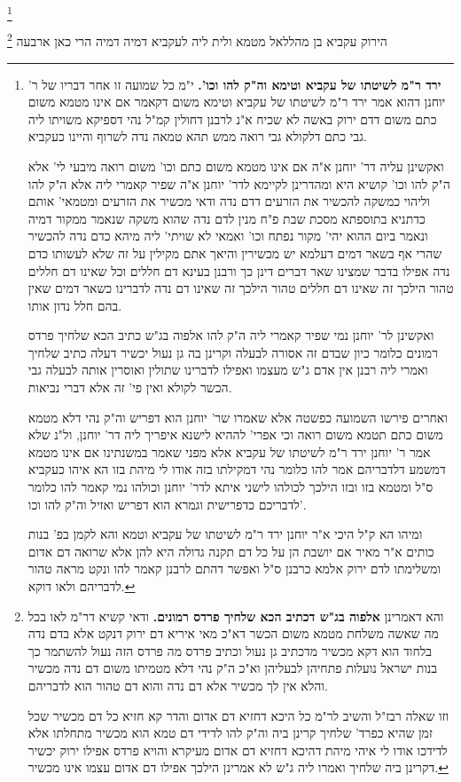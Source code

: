 \documentclass[12pt, openany]{book}
\newcommand{\footnotecomment}[1]{\footnote{#1}}
\newcommand{\commenta}[1]{\footnotecomment{#1}}
\begin{document}
{\commenta{\textbf{ירד ר"מ לשיטתו של עקביא וטימא וה"ק להו וכו'.}  י"מ כל שמועה זו אחר דבריו של ר' יוחנן דהוא אמר ירד ר"מ לשיטתו של עקביא וטימא משום דקאמר אם אינו מטמא משום כתם משום דדם ירוק באשה לא שכיח א"נ לרבנן דחולין קמ"ל נהי דספיקא משויתו ליה גבי כתם דלקולא גבי רואה ממש תהא טמאה נדה לשרוף והיינו כעקביא.\par  ואקשינן עליה דר' יוחנן א"ה אם אינו מטמא משום כתם וכו' משום רואה מיבעי לי' אלא ה"ק להו וכו' קושיא היא ומהדרינן לקיימא לדר' יוחנן א"ה שפיר קאמרי ליה אלא ה"ק להו וליהוי כמשקה להכשיר את הזרעים דדם נדה ודאי מכשיר את הזרעים ומטמאי' אותם כדתניא בתוספתא מסכת שבת פ"ח מנין לדם נדה שהוא משקה שנאמר ממקור דמיה ונאמר ביום ההוא יהי' מקור נפתח וכו' ואמאי לא שויתי' ליה מיהא כדם נדה להכשיר שהרי אף בשאר דמים דעלמא יש מכשירין והיאך אתם מקילין על זה שלא לעשותו כדם נדה אפילו בדבר שמצינו שאר דברים דינן כך ורבנן בעינא דם חללים וכל שאינו דם חללים טהור הילכך זה שאינו דם חללים טהור הילכך זה שאינו דם נדה לדברינו כשאר דמים שאין בהם חלל נדון אותו.\par  ואקשינן לר' יוחנן נמי שפיר קאמרי ליה ה"ק להו אלפוה בג"ש כתיב הכא שלחיך פרדס רמונים כלומר כיון שבדם זה אסורה לבעלה וקרינן בה גן נעול יכשיר דעלה כתיב שלחיך ואמרי ליה רבנן אין אדם ג"ש מעצמו ואפילו לדברינו שתולין ואוסרין אותה לבעלה גבי הכשר לקולא ואין פי' זה אלא דברי נביאות.\par  ואחרים פירשו השמועה כפשטה אלא שאמרו שר' יוחנן הוא דפריש וה"ק נהי דלא מטמא משום כתם תטמא משום רואה וכי אפרי' לההיא לישנא איפריך ליה דר' יוחנן, ול"נ שלא אמר ר' יוחנן ירד ר"מ לשיטתו של עקביא אלא מפני שאמר במשנתינו אם אינו מטמא דמשמע דלדבריהם אמר להו כלומר נהי דמקילתו בזה אודו לי מיהת בזו הא איהו כעקביא ס"ל ומטמא בזו ובזו הילכך לכולהו לישני איתא לדר' יוחנן וכולהו נמי קאמר להו כלומר לדבריכם כדפרישית וגמרא הוא דפריש ואזיל וה"ק להו וכו'.\par ומיהו הא ק"ל היכי א"ר יוחנן ירד ר"מ לשיטתו של עקביא וטמא והא לקמן בפ' בנות כותים א"ר מאיר אם יושבת הן על כל דם תקנה גדולה היא להן אלא שרואה דם אדום ומשלימתו לדם ירוק אלמא כרבנן ס"ל ואפשר דהתם לרבנן קאמר להו ונקט מראה טהור לדבריהם ולאו דוקא. }

הירוק עקביא בן מהללאל מטמא  ולית ליה לעקביא דמיה דמיה הרי כאן ארבעה 
\commenta{ והא דאמרינן \textbf{אלפוה בג"ש דכתיב הכא שלחיך פרדס רמונים.}  ודאי קשיא דר"מ לאו בכל מה שאשה משלחת מטמא משום הכשר דא"כ מאי איריא דם ירוק דנקט אלא בדם נדה בלחוד הוא דקא מכשיר מדכתיב גן נעול וכתיב פרדס מה פרדס הזה נעול להשתמר כך בנות ישראל נועלות פתחיהן לבעליהן וא"כ ה"ק נהי דלא מטמיתו משום דם נדה מכשיר והלא אין לך מכשיר אלא דם נדה והוא דם טהור הוא לדבריהם.\par  וזו שאלה רבז"ל והשיב לר"מ כל היכא דחזיא דם אדום והדר קא חזיא כל דם מכשיר שכל זמן שהיא כפרד' שלחיך קרינן ביה וה"ק להו לדידי דם טמא הוא מכשיר מתחלתו אלא לדידכו אודו לי איהי מיהת דהיכא דחזיא דם אדום מעיקרא והויא פרדס אפילו ירוק יכשיר דקרינן ביה שלחיך ואמרו ליה ג"ש לא אמרינן הילכך אפילו דם אדום עצמו אינו מכשיר. }

}
\end{document}
